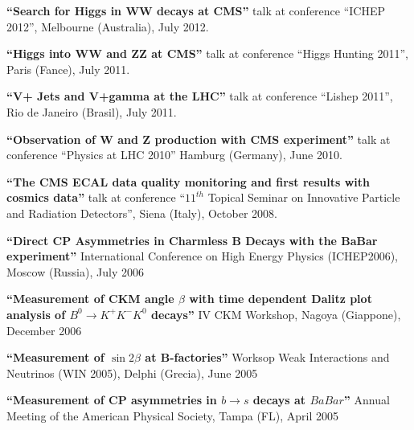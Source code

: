  {\bf ``Search for Higgs in WW decays at CMS''}
  talk at conference ``ICHEP 2012'', Melbourne (Australia), July 2012.

  {\bf ``Higgs into WW and ZZ at CMS''}
  talk at conference ``Higgs Hunting 2011'', Paris (Fance), July 2011.

  {\bf ``V+ Jets and V+gamma at the LHC''}
  talk at conference ``Lishep 2011'', Rio de Janeiro (Brasil), July 2011.

  {\bf ``Observation of W and Z production with CMS experiment'' }
  talk at conference ``Physics at LHC 2010'' Hamburg (Germany), June 2010.

  {\bf ``The CMS ECAL data quality monitoring and first results with cosmics data''}
  talk at conference ``$11^{th}$ Topical Seminar on Innovative Particle and Radiation Detectors'',
  Siena (Italy), October 2008.

  {\bf ``Direct CP Asymmetries in Charmless B Decays with the BaBar experiment''}
  International Conference on High Energy Physics (ICHEP2006), Moscow (Russia), July 2006
  \vspace{3mm}

  {\bf ``Measurement of CKM angle $\beta$ with time dependent Dalitz plot analysis of 
    $B^0\rightarrow K^+K^-K^0$ decays''}
  IV CKM Workshop, Nagoya (Giappone), December 2006

  {\bf ``Measurement of $\sin 2\beta$ at B-factories''}
  Worksop Weak Interactions and Neutrinos (WIN 2005), Delphi (Grecia), June 2005
  \vspace{3mm}

  {\bf ``Measurement of CP asymmetries in $b \rightarrow s$ decays at $BaBar$''}
  Annual Meeting of the American Physical Society, Tampa (FL), April 2005
  \vspace{3mm}


